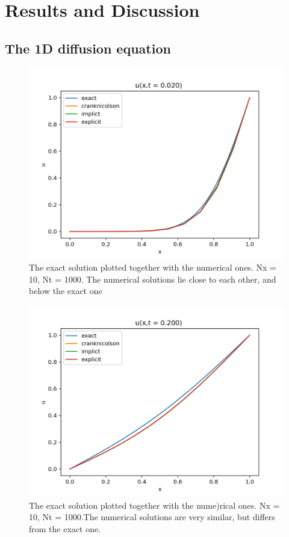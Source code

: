 \documentclass{article}
\begin{document}
\section{Results and Discussion}
\subsection{The 1D diffusion equation}
\begin{figure}
  \includegraphics[width=\linewidth]{Nt1000Nx10t02.png}
  \caption{The exact solution plotted together with the numerical ones. Nx = 10, Nt = 1000. The numerical solutions lie close to each other, and below the exact one}
  \label{fig:Nt1000Nx10t02}
\end{figure} 

\begin{figure}
  \includegraphics[width=\linewidth]{Nt1000Nx10t2.png}
  \caption{The exact solution plotted together with the nume)rical ones. Nx = 10, Nt = 1000.The numerical solutions are very similar, but differs from the exact one. }
  \label{fig:Nt1000Nx10t2}
\end{figure} 
\end{document}
